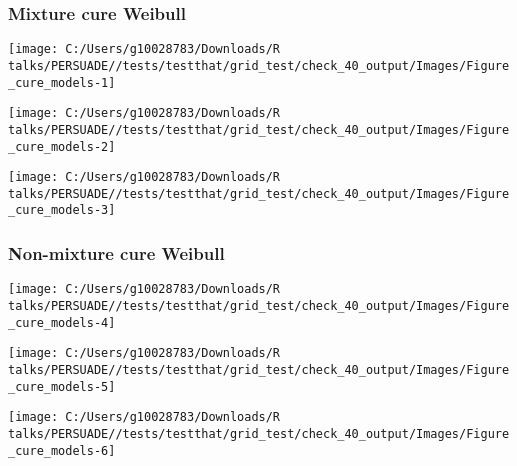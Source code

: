 \documentclass[
]{article}
\begin{document}
\clearpage

\clearpage

\subsubsection{Mixture cure Weibull}\label{mixture-cure-weibull}

\begin{flushleft}\texttt{[image: C:/Users/g10028783/Downloads/R talks/PERSUADE//tests/testthat/grid\_test/check\_40\_output/Images/Figure\_cure\_models-1]} \end{flushleft}

\begin{flushleft}\texttt{[image: C:/Users/g10028783/Downloads/R talks/PERSUADE//tests/testthat/grid\_test/check\_40\_output/Images/Figure\_cure\_models-2]} \end{flushleft}

\begin{flushleft}\texttt{[image: C:/Users/g10028783/Downloads/R talks/PERSUADE//tests/testthat/grid\_test/check\_40\_output/Images/Figure\_cure\_models-3]} \end{flushleft}

\clearpage

\subsubsection{Non-mixture cure Weibull}\label{non-mixture-cure-weibull}

\begin{flushleft}\texttt{[image: C:/Users/g10028783/Downloads/R talks/PERSUADE//tests/testthat/grid\_test/check\_40\_output/Images/Figure\_cure\_models-4]} \end{flushleft}

\begin{flushleft}\texttt{[image: C:/Users/g10028783/Downloads/R talks/PERSUADE//tests/testthat/grid\_test/check\_40\_output/Images/Figure\_cure\_models-5]} \end{flushleft}

\begin{flushleft}\texttt{[image: C:/Users/g10028783/Downloads/R talks/PERSUADE//tests/testthat/grid\_test/check\_40\_output/Images/Figure\_cure\_models-6]} \end{flushleft}

\clearpage
\end{document}
